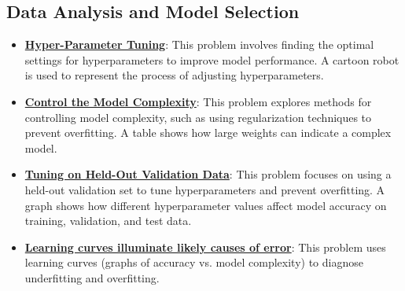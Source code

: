\documentclass{article}%
\begin{document}
%
\subsection{Data Analysis and Model Selection}%
\label{subsec:DataAnalysisandModelSelection}%
\begin{itemize}[leftmargin=*]%
\item \href{https://purdue.brightspace.com/d2l/common/assets/pdfjs-d2l-dist/1.0.14-legacy/web/viewer.html?file=\%2Fcontent\%2Fenforced\%2F1095467-wl.202510.CS.24300.001\%2F10L1-CrossValidation.pdf\%3Fou\%3D1095467\&lang=en-us\&container=d2l-fileviewer-rendered-pdf\&fullscreen=d2l-fileviewer-rendered-pdf-dialog\&height=667#page=14}{\textbf{Hyper-Parameter Tuning}}: This problem involves finding the optimal settings for hyperparameters to improve model performance. A cartoon robot is used to represent the process of adjusting hyperparameters.%
\item \href{https://purdue.brightspace.com/d2l/common/assets/pdfjs-d2l-dist/1.0.14-legacy/web/viewer.html?file=\%2Fcontent\%2Fenforced\%2F1095467-wl.202510.CS.24300.001\%2F10L1-CrossValidation.pdf\%3Fou\%3D1095467\&lang=en-us\&container=d2l-fileviewer-rendered-pdf\&fullscreen=d2l-fileviewer-rendered-pdf-dialog\&height=667#page=16}{\textbf{Control the Model Complexity}}: This problem explores methods for controlling model complexity, such as using regularization techniques to prevent overfitting. A table shows how large weights can indicate a complex model.%
\item \href{https://purdue.brightspace.com/d2l/common/assets/pdfjs-d2l-dist/1.0.14-legacy/web/viewer.html?file=\%2Fcontent\%2Fenforced\%2F1095467-wl.202510.CS.24300.001\%2F10L1-CrossValidation.pdf\%3Fou\%3D1095467\&lang=en-us\&container=d2l-fileviewer-rendered-pdf\&fullscreen=d2l-fileviewer-rendered-pdf-dialog\&height=667#page=19}{\textbf{Tuning on Held-Out Validation Data}}: This problem focuses on using a held-out validation set to tune hyperparameters and prevent overfitting. A graph shows how different hyperparameter values affect model accuracy on training, validation, and test data.%
\item \href{https://purdue.brightspace.com/d2l/common/assets/pdfjs-d2l-dist/1.0.14-legacy/web/viewer.html?file=\%2Fcontent\%2Fenforced\%2F1095467-wl.202510.CS.24300.001\%2F10L1-CrossValidation.pdf\%3Fou\%3D1095467\&lang=en-us\&container=d2l-fileviewer-rendered-pdf\&fullscreen=d2l-fileviewer-rendered-pdf-dialog\&height=667#page=20}{\textbf{Learning curves illuminate likely causes of error}}: This problem uses learning curves (graphs of accuracy vs. model complexity) to diagnose underfitting and overfitting.%

\end{itemize}
\end{document}
